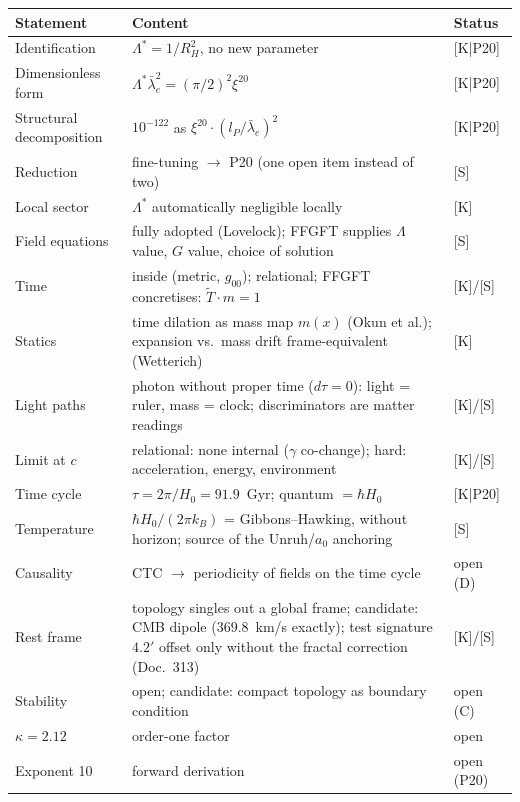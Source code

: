 \begin{center}
\begin{tabular}{lp{6.5cm}l}
\toprule
Statement & Content & Status \\
\midrule
Identification & $\Lambda^{*} = 1/R_H^2$, no new parameter
  & [K|P20] \\
Dimensionless form & $\Lambda^{*}\bar\lambda_e^2 = (\pi/2)^2\xi^{20}$
  & [K|P20] \\
Structural decomposition & $10^{-122}$ as $\xi^{20}\cdot(l_P/\bar\lambda_e)^2$
  & [K|P20] \\
Reduction & fine-tuning $\to$ P20 (one open item instead of two)
  & [S] \\
Local sector & $\Lambda^{*}$ automatically negligible locally
  & [K] \\
Field equations & fully adopted (Lovelock); FFGFT supplies
  $\Lambda$ value, $G$ value, choice of solution & [S] \\
Time & inside (metric, $g_{00}$); relational; FFGFT concretises:
  $\tilde T \cdot m = 1$ & [K]/[S] \\
Statics & time dilation as mass map $m(x)$ (Okun et al.);
  expansion vs.\ mass drift frame-equivalent (Wetterich) & [K] \\
Light paths & photon without proper time ($d\tau=0$): light =
  ruler, mass = clock; discriminators are matter readings & [K]/[S] \\
Limit at $c$ & relational: none internal ($\gamma$ co-change);
  hard: acceleration, energy, environment & [K]/[S] \\
Time cycle & $\tau = 2\pi/H_0 = 91.9$~Gyr; quantum $= \hbar H_0$
  & [K|P20] \\
Temperature & $\hbar H_0/(2\pi k_B)$ = Gibbons--Hawking, without
  horizon; source of the Unruh/$a_0$ anchoring & [S] \\
Causality & CTC $\to$ periodicity of fields on the time cycle
  & open (D) \\
Rest frame & topology singles out a global frame; candidate: CMB
  dipole ($369.8$~km/s exactly); test signature $4.2'$ offset
  only without the fractal correction (Doc.~313) & [K]/[S] \\
Stability & open; candidate: compact topology as boundary condition
  & open (C) \\
$\kappa = 2.12$ & order-one factor & open \\
Exponent 10 & forward derivation & open (P20) \\
\bottomrule
\end{tabular}
\end{center}

